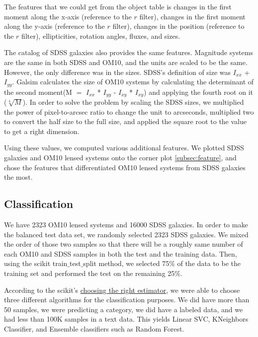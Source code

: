 \documentclass[\docopts]{\docclass}
\begin{document}
The features that we could get from the object table is changes in the first moment along the x-axis (reference to the $r$ filter), changes in the first moment along the y-axis (reference to the $r$ filter), changes in the position (reference to the $r$ filter), ellipticities, rotation angles, fluxes, and sizes.

The catalog of SDSS galaxies also provides the same features. Magnitude systems are the same in both SDSS and OM10, and the units are scaled to be the same. However, the only difference was in the sizes. SDSS's definition of size was $I_{xx}$ + $I_{yy}$. Galsim calculates the size of OM10 systems by calculating the determinant of the second moment(M $=$ $I_{xx}$ * $I_{yy}$ - $I_{xy}$ * $I_{xy}$) and applying the fourth root on it ($\sqrt[4]{M}$). In order to solve the problem by scaling the SDSS sizes, we multiplied the power of pixel-to-arcsec ratio to change the unit to arcseconds, multiplied two to convert the half size to the full size, and applied the square root to the value to get a right dimension.

Using these values, we computed various additional features. We plotted SDSS galaxies and OM10 lensed systems onto the corner plot \ref{subsec:feature}, and chose the features that differentiated OM10 lensed systems from SDSS galaxies the most.

\subsection{Classification}
\label{subsec:classification}

We have 2323 OM10 lensed systems and 16000 SDSS galaxies. In order to make the balanced test data set, we randomly selected 2323 SDSS galaxies. We mixed the order of those two samples so that there will be a roughly same number of each OM10 and SDSS samples in both the test and the training data. Then, using the scikit train$\_$test$\_$split method, we selected 75$\%$ of the data to be the training set and performed the test on the remaining 25$\%$.

According to the scikit's \href{http://scikit-learn.org/stable/tutorial/machine_learning_map/index.html} {choosing the right estimator}, we were able to choose three different algorithms for the classification purposes. We did have more than 50 samples, we were predicting a category, we did have a labeled data, and we had less than 100K samples in a text data. This yields Linear SVC, KNeighbors Classifier, and Ensemble classifiers such as Random Forest.
\end{document}
